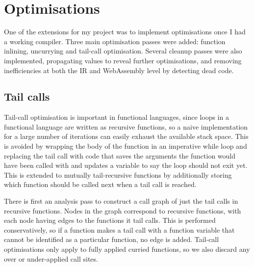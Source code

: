 \section{Optimisations} \label{opts}

One of the extensions for my project was to implement optimisations once I had a working compiler. Three main optimisation passes were added: function inlining, uncurrying and tail-call optimisation. Several cleanup passes were also implemented, propagating values to reveal further optimisations, and removing inefficiencies at both the IR and WebAssembly level by detecting dead code.

\subsection{Tail calls}
Tail-call optimisation is important in functional languages, since loops in a functional language are written as recursive functions, so a naive implementation for a large number of iterations can easily exhaust the available stack space. This is avoided by wrapping the body of the function in an imperative while loop and replacing the tail call with code that saves the arguments the function would have been called with and updates a variable to say the loop should not exit yet. This is extended to mutually tail-recursive functions by additionally storing which function should be called next when a tail call is reached.

There is first an analysis pass to construct a call graph of just the tail calls in recursive functions. Nodes in the graph correspond to recursive functions, with each node having edges to the functions it tail calls. This is performed conservatively, so if a function makes a tail call with a function variable that cannot be identified as a particular function, no edge is added.  Tail-call optimisations only apply to fully applied curried functions, so we also discard any over or under-applied call sites.



